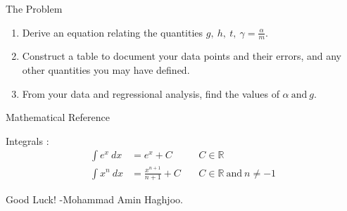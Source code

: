 \documentclass{article}
\begin{document}
\begin{center}
    \huge The Problem
\end{center}

\vspace{0.4 cm}

\begin{enumerate}[label = \alph*]
    \item Derive an equation relating the quantities $g,\ h,\ t, \ \gamma = \frac{\alpha}{m}$.
    \item Construct a table to document your data points and their errors, and any other quantities you may have defined.
    \item From your data and regressional analysis, find the values of $\alpha \ \text{and} \ g$.
\end{enumerate}

\begin{center}
    \huge Mathematical Reference
\end{center}
\vspace{0.5 cm}
Integrals :
\begin{align}
    \int e^x \ dx &=e^x+C& \ &C \in \mathbb{R} \\
    \int x^n \ dx &=\frac{x^{n+1}}{n+1}+C& \ &C \in \mathbb{R} \ \text{and} \ n\neq -1
\end{align}

Good Luck! \vspace{5 mm} -Mohammad Amin Haghjoo.
\end{document}
